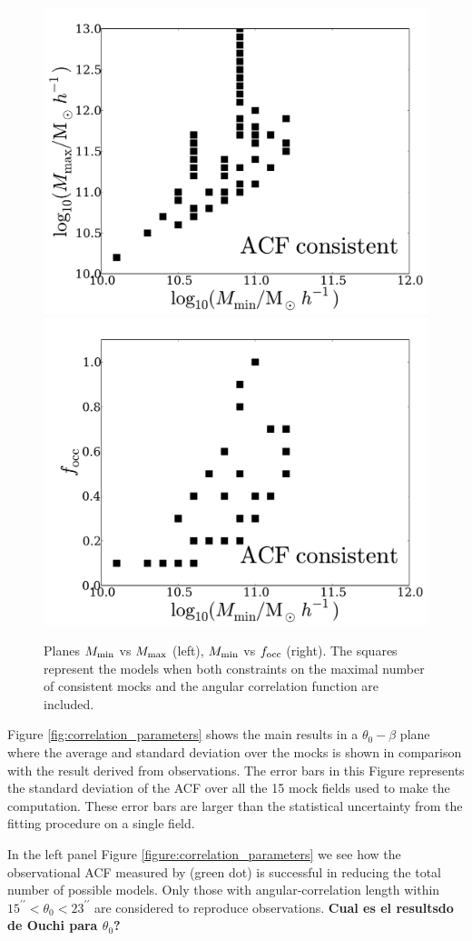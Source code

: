 \documentclass[usenatbib]{mn2e}
\begin{document}
\begin{figure}
\begin{center}
\includegraphics[width=0.46\linewidth,angle=0]{./plots/Fig6_mass.pdf}
\hspace{5mm}
\includegraphics[width=0.46\linewidth,angle=0]{./plots/Fig6_f_occ.pdf}
\end{center}
\caption{Planes $M_{\rm min}$ vs $M_{\rm max}$ (left), $M_{\rm min}$
  vs $f_{\rm occ}$ (right). The squares represent the models when both
   constraints on the maximal number of  consistent mocks and the
  angular correlation function are included. 
  \label{fig:restriction_mock_and_f_occ_corr}} 
\end{figure} 


Figure \ref{fig:correlation_parameters} shows the main results in a
$\theta_{0}-\beta$  plane where the average and standard deviation
over the mocks is shown in comparison with the result derived from
observations.  The error bars in this Figure represents the standard
deviation of the ACF over all the 15 mock fields used to make the
computation.  These error bars are larger than the statistical
uncertainty from the fitting procedure on a single field.  

In the left panel Figure \ref{figure:correlation_parameters} we see
how the observational ACF measured by \cite{Hayashino2004} (green dot)
is successful in reducing the total number of possible models. Only
those with angular-correlation length within
$15^{\prime\prime}<\theta_{0}<23^{\prime\prime}$ are considered to
reproduce observations. {\bf Cual es el resultsdo de Ouchi
  para $\theta_0$?}
\end{document}
